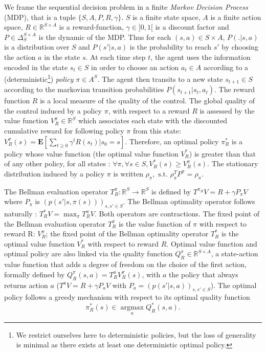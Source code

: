 \documentclass[smallextended]{svjour3}
\newcommand{\E}{\mathbf{E}}
\newcommand{\argmax}{\operatorname*{argmax}} %
\begin{document}
We frame the sequential decision problem in a finite \emph{Markov Decision Process} (MDP), that is a tuple $\{S,A,P,R,\gamma\}$. $S$ is a finite state space, $A$ is a finite action space, $R\in\mathbb{R}^{S\times A}$ is a reward-function, $\gamma\in ]0,1[$ is a discount factor and $P\in \Delta_{S}^{S\times A}$ is the dynamic of the MDP. Thus for each $(s,a)\in S\times A$, $P(.|s,a)$ is a distribution over $S$ and $P(s'|s,a)$ is the probability to reach $s'$ by choosing the action $a$ in the state $s$. At each time step $t$, the agent uses the information encoded in the state $s_t\in S$ in order to choose an action $a_t \in A$ according to a (deterministic\footnote{We restrict ourselves here to deterministic policies, but the loss of generality is minimal as there exists at least one deterministic optimal policy.}) \emph{policy} $\pi\in A^S$. The agent then transits to a new state $s_{t+1}\in S$ according to the markovian transition probabilities $P(s_{t+1}|s_t,a_t)$. The reward function $R$ is a local measure of the quality of the control. The global quality of the control induced by a policy $\pi$, with respect to a reward $R$ is assessed by the value function $V^\pi_R \in \mathbb{R}^{S}$ which associates each state with the discounted cumulative reward for following policy $\pi$ from this state: $V^\pi_R(s) = \E[\sum_{t\geq 0}\gamma^tR(s_t)|s_0 = s]$. Therefore, an optimal policy $\pi^*_R$ is a policy whose value function (the optimal value function $V^*_R$) is greater than that of any other policy, for all states : $\forall \pi, \forall s \in S, V^*_R(s) \geq V^\pi_R(s)$. The stationary distribution induced by a policy $\pi$ is written $\rho_\pi,\textrm{ s.t. }\rho_\pi^TP^\pi = \rho_\pi$.

The Bellman evaluation operator $T^\pi_R: \mathbb{R}^{S} \rightarrow  \mathbb{R}^{S}$ is defined by $T^{\pi_R}V = R + \gamma P_\pi V$ where $P_\pi$ is $(p(s'|s,\pi(s)))_{s,s' \in S}$. The Bellman optimality operator follows naturally : $T^*_RV = \max_\pi T^\pi_RV$. Both operators are contractions. The fixed point of the Bellman evaluation operator $T^\pi_R$ is the value function of $\pi$ with respect to reward R: $V^\pi_R$; the fixed point of the Bellman optimality operator $T^*_R$ is the optimal value function $V_R^*$ with respect to reward $R$. Optimal value function and optimal policy are also linked via the quality function $Q^\pi_R\in\mathbb{R}^{S\times A}$, a state-action value function that adds a degree of freedom on the choice of the first action, formally defined by $Q^\pi_R(s,a) = T^a_RV^\pi_R(s)$, with $a$ the policy that always returns action $a$ ($T^aV = R + \gamma P_a V$ with $P_a = (p(s'|s,a))_{s,s' \in S}$). The optimal policy follows a greedy mechanism with respect to its optimal quality function 
\begin{equation}
  \label{eq:greedy}
  \pi^*_R(s)\in\argmax_aQ^*_R(s,a).
\end{equation}
\end{document}
